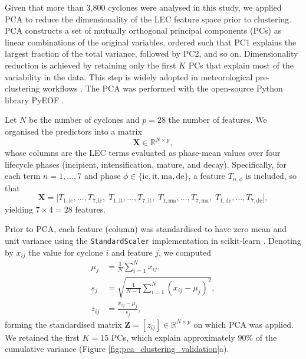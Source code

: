 \documentclass[pdflatex,sn-chicago]{sn-jnl}%
\theoremstyle{plain}
\theoremstyle{definition}
\theoremstyle{remark}
\theoremstyle{definition}
\begin{document}
Given that more than 3{,}800 cyclones were analysed in this study, we applied PCA to reduce the dimensionality of the LEC feature space prior to clustering. PCA constructs a set of mutually orthogonal principal components (PCs) as linear combinations of the original variables, ordered such that PC1 explains the largest fraction of the total variance, followed by PC2, and so on. Dimensionality reduction is achieved by retaining only the first $K$ PCs that explain most of the variability in the data. This step is widely adopted in meteorological pre-clustering workflows \citep[e.g.,][]{camus2014,de2022hybrid,borato2024evaluation,pozo2025characterising,zhong2025advanced}. The PCA was performed with the open-source Python library PyEOF \citep{zheng_2021}.

Let $N$ be the number of cyclones and $p=28$ the number of features. We organised the predictors into a matrix
\begin{equation}
\mathbf{X} \in \mathbb{R}^{N \times p},
\end{equation}
whose columns are the LEC terms evaluated as phase-mean values over four lifecycle phases (incipient, intensification, mature, and decay). Specifically, for each term $n=1,\ldots,7$ and phase $\phi \in \{\mathrm{ic},\mathrm{it},\mathrm{ma},\mathrm{de}\}$, a feature $T_{n,\phi}$ is included, so that
\begin{equation}
\mathbf{X} = \big[T_{1,\mathrm{ic}}, \ldots, T_{7,\mathrm{ic}},\;
               T_{1,\mathrm{it}}, \ldots, T_{7,\mathrm{it}},\;
               T_{1,\mathrm{ma}}, \ldots, T_{7,\mathrm{ma}},\;
               T_{1,\mathrm{de}}, \ldots, T_{7,\mathrm{de}}\big],
\end{equation}
yielding $7 \times 4 = 28$ features.

Prior to PCA, each feature (column) was standardised to have zero mean and unit variance using the \texttt{StandardScaler} implementation in scikit-learn \citep{pedregosa2011scikit}. Denoting by $x_{ij}$ the value for cyclone $i$ and feature $j$, we computed
\begin{align}
\mu_j &= \frac{1}{N}\sum_{i=1}^{N} x_{ij},\\
s_j  &= \sqrt{\frac{1}{N-1}\sum_{i=1}^{N} (x_{ij}-\mu_j)^2},\\
z_{ij} &= \frac{x_{ij}-\mu_j}{s_j},
\end{align}
forming the standardised matrix $\mathbf{Z}=[z_{ij}] \in \mathbb{R}^{N \times p}$ on which PCA was applied. We retained the first $K=15$ PCs, which explain approximately $90\%$ of the cumulative variance (Figure \ref{fig:pca_clustering_validation}a).
\end{document}
